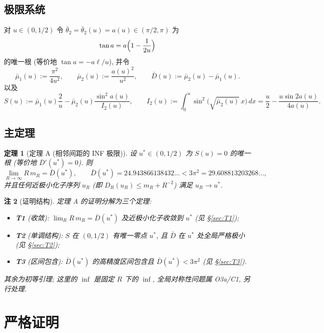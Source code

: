\documentclass[UTF8]{ctexart}
\newtheorem{theorem}{定理}[section]
\newtheorem{remark}[theorem]{注}
\begin{document}
\subsection{极限系统}
对 $u\in(0,1/2)$ 令 $\bar\theta_2=\bar\theta_2(u)=a(u)\in(\pi/2,\pi)$ 为
\begin{equation}
	\tan a=a\Bigl(1-\frac1{2u}\Bigr)
\end{equation}
的唯一根 (等价地 $\tan a=-a\ell/u$), 并令
\begin{equation}
	\bar\mu_1(u):=\frac{\pi^2}{4u^2},\qquad
	\bar\mu_2(u):=\frac{a(u)^2}{u^2},\qquad
	\bar D(u):=\bar\mu_2(u)-\bar\mu_1(u).
\end{equation}
以及
\begin{equation}
	S(u):=\bar\mu_1(u)\frac2u-\bar\mu_2(u)\frac{\sin^2 a(u)}{I_2(u)},
	\qquad I_2(u):=\int_0^u\sin^2\bigl(\sqrt{\bar\mu_2(u)}\,x\bigr)\,dx
	=\frac u2-\frac{u\sin 2a(u)}{4a(u)}.
\end{equation}

\subsection{主定理}
\begin{theorem}[定理 A (相邻间距的 INF 极限)]
设 $u^*\in(0,1/2)$ 为 $S(u)=0$ 的唯一根 (等价地 $\bar D'(u^*)=0$). 则
\begin{equation}
	\lim_{R\to\infty} R\,m_R=\bar D(u^*),\qquad
	\bar D(u^*)=24.943866138432\ldots<3\pi^2=29.608813203268\ldots,
\end{equation}
并且任何近极小化子序列 $u_R$ (即 $D_R(u_R)\le m_R+R^{-2}$) 满足 $u_R\to u^*$.
\end{theorem}

\begin{remark}[证明结构]
定理 A 的证明分解为三个定理:
\begin{itemize}
	\item \textbf{T1} (收敛): $\lim_R R\,m_R=\bar D(u^*)$ 及近极小化子收敛到 $u^*$ (见 §\ref{sec:T1});
	\item \textbf{T2} (单调结构): $S$ 在 $(0,1/2)$ 有唯一零点 $u^*$, 且 $\bar D$ 在 $u^*$ 处全局严格极小 (见 §\ref{sec:T2});
	\item \textbf{T3} (区间包含): $\bar D(u^*)$ 的高精度区间包含且 $\bar D(u^*)<3\pi^2$ (见 §\ref{sec:T3}).
\end{itemize}
其余为初等引理; 这里的 $\inf$ 是固定 $R$ 下的 $\inf$, 全局对称性问题属 O3a/C1, 另行处理.
\end{remark}

\section{严格证明}
\end{document}
